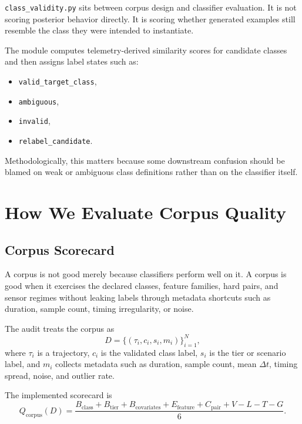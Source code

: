 \documentclass[11pt]{article}
\begin{document}
\texttt{class\_validity.py} sits between corpus design and classifier
evaluation. It is not scoring posterior behavior directly. It is scoring whether
generated examples still resemble the class they were intended to instantiate.

The module computes telemetry-derived similarity scores for candidate classes
and then assigns label states such as:
\begin{itemize}[leftmargin=1.5em]
    \item \texttt{valid\_target\_class},
    \item \texttt{ambiguous},
    \item \texttt{invalid},
    \item \texttt{relabel\_candidate}.
\end{itemize}

Methodologically, this matters because some downstream confusion should be
blamed on weak or ambiguous class definitions rather than on the classifier
itself.

\section{How We Evaluate Corpus Quality}

\subsection{Corpus Scorecard}

A corpus is not good merely because classifiers perform well on it. A corpus is
good when it exercises the declared classes, feature families, hard pairs, and
sensor regimes without leaking labels through metadata shortcuts such as
duration, sample count, timing irregularity, or noise.

The audit treats the corpus as
\begin{equation}
    D = \{(\tau_i, c_i, s_i, m_i)\}_{i=1}^{N},
\end{equation}
where \(\tau_i\) is a trajectory, \(c_i\) is the validated class label,
\(s_i\) is the tier or scenario label, and \(m_i\) collects metadata such as
duration, sample count, mean \(\Delta t\), timing spread, noise, and outlier
rate.

The implemented scorecard is
\begin{equation}
    Q_{\text{corpus}}(D)
    =
    \frac{
    B_{\text{class}}
    +
    B_{\text{tier}}
    +
    B_{\text{covariates}}
    +
    E_{\text{feature}}
    +
    C_{\text{pair}}
    +
    V
    -
    L
    -
    T
    -
    G
    }{6}.
\end{equation}
\end{document}
